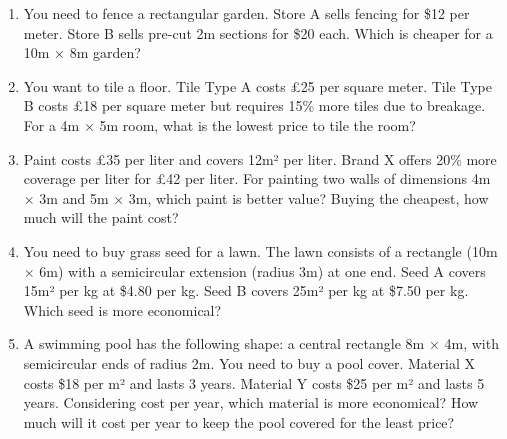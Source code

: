 \documentclass[12pt]{article}
\begin{document}
\begin{enumerate}[resume]
\item You need to fence a rectangular garden. Store A sells fencing for \$12 per meter. Store B sells pre-cut 2m sections for \$20 each. Which is cheaper for a 10m × 8m garden?

\item You want to tile a floor. Tile Type A costs £25 per square meter. Tile Type B costs £18 per square meter but requires 15\% more tiles due to breakage. For a 4m × 5m room, what is the lowest price to tile the room?

\item Paint costs £35 per liter and covers 12m² per liter. Brand X offers 20\% more coverage per liter for £42 per liter. For painting two walls of dimensions 4m × 3m and 5m × 3m, which paint is better value? Buying the cheapest, how much will the paint cost?

\newpage{}

\item You need to buy grass seed for a lawn. The lawn consists of a rectangle (10m × 6m) with a semicircular extension (radius 3m) at one end. Seed A covers 15m² per kg at \$4.80 per kg. Seed B covers 25m² per kg at \$7.50 per kg. Which seed is more economical?

\begin{center}
\end{center}

\item A swimming pool has the following shape: a central rectangle 8m × 4m, with semicircular ends of radius 2m. You need to buy a pool cover. Material X costs \$18 per m² and lasts 3 years. Material Y costs \$25 per m² and lasts 5 years. Considering cost per year, which material is more economical? How much will it cost per year to keep the pool covered for the least price?

\begin{center}
\end{center}

\end{enumerate}
\end{document}
